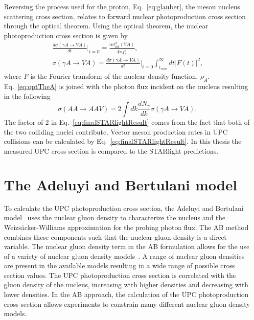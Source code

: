     Reversing the process used for the proton, Eq.~\ref{eq:glauber}, the meson 
      nucleus scattering cross section, relates to forward nuclear 
      photoproduction cross section through the optical theorem. 
    Using the optical theorem, the nuclear photoproduction cross section is 
      given by 
    \begin{eqnarray} \label{eq:optTheA}
      \frac{d\sigma(\gamma A\rightarrow VA)}{dt}\Big|_{t=0}=
      \frac{\alpha\sigma_{tot}^{2}(VA)}{4\pi f_{v}^{2}}\nonumber \textrm{,}\\
      \sigma(\gamma A\rightarrow VA)=\frac{d\sigma(\gamma A\rightarrow VA)}{dt}
      \Big|_{t=0}\int_{t_{min}}^{\infty}dt|F(t)|^{2} \textrm{,}
    \end{eqnarray}
    where $F$ is the Fourier transform of the nuclear density function, 
      $\rho_{A}$.
    Eq.~\ref{eq:optTheA} is joined with the photon flux incident on the nucleus 
      resulting in the following
    \begin{equation} \label{eq:finalSTARlightResult}
      \sigma(AA\rightarrow AAV)=2\int{dk\frac{dN_{\gamma}}{dk}
                    \sigma(\gamma A\rightarrow VA)}.
    \end{equation}
    The factor of 2 in Eq.~\ref{eq:finalSTARlightResult} comes from the fact that 
      both of the two colliding nuclei contribute. 
    Vector meson production rates in UPC collisions can be calculated
      by Eq.~\ref{eq:finalSTARlightResult}.
    In this thesis the measured UPC \JPsi{} cross section is compared to the
      STARlight predictions. 

  \section{The Adeluyi and Bertulani model \label{sec:pQCDapp}}
    To calculate the UPC \JPsi{} photoproduction cross section, the Adeluyi 
      and Bertulani model~\cite{pQCD2011.08,pQCD2013.02,Pumplin:2002vw,Martin:2009iq} uses the nuclear gluon density to characterize the 
      nucleus and the Weizs\"{a}cker-Williams approximation for the probing 
      photon flux. 
    The AB method combines these components such that the nuclear gluon 
      density is a direct variable.
    The nuclear gluon density term in the AB formulation allows for 
      the use of a variety of nuclear gluon density models~\cite{Eskola:2008ca,Eskola:2009uj}.
    A range of nuclear gluon densities are present in the available models
      resulting in a wide range of possible cross section values. 
    The UPC \JPsi{} photoproduction cross section is correlated with the gluon
      density of the nucleus, increasing with higher densities and decreasing 
      with lower densities. 
    In the AB approach, the calculation of the UPC \JPsi{} photoproduction 
      cross section allows experiments to constrain many different nuclear 
      gluon density models. 
    
